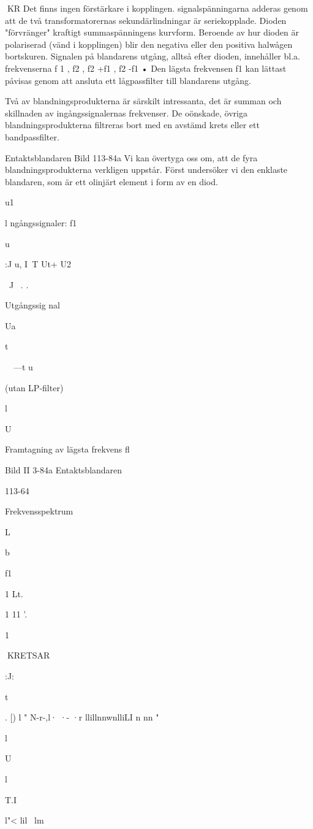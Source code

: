 \documentclass[a4paper,twoside,twocolumn,openright]{book}
\begin{document}
{{{{{{{KR
Det finns ingen förstärkare i kopplingen.
signalspänningarna adderas genom att de
två transformatorernas sekundärlindningar
är seriekopplade. Dioden "förvränger" kraftigt summaspänningens kurvform. Beroende
av hur dioden är polariserad (vänd i kopplingen) blir den negativa eller den positiva
halwågen bortskuren.
Signalen på blandarens utgång, alltså
efter dioden, innehåller bl.a. frekvenserna f 1 ,
f2 , f2 +f1 , f2 -f1 • Den lägsta frekvensen f1 kan
lättast påvisas genom att ansluta ett lågpassfilter till blandarens utgång.

Två av blandningsprodukterna är särskilt
intressanta, det är summan och skillnaden
av ingångssignalernas frekvenser. De oönskade, övriga blandningsprodukterna filtreras bort med en avstämd krets eller ett
bandpassfilter.

Entaktsblandaren
Bild 113-84a
Vi kan övertyga oss om, att de fyra blandningsprodukterna verkligen uppstår. Först
undersöker vi den enklaste blandaren, som
är ett olinjärt element i form av en diod.

u1

l ngångssignaler:
f1

u

:J u, I~T
Ut+ U2

~J~ . .

Utgångssig nal

Ua

t

~~---t
u

(utan LP-filter)

l

U

Framtagning av lägsta frekvens fl

Bild II 3-84a Entaktsblandaren

113-64

Frekvensspektrum

L

b

f1

1 Lt.~

1 11
'.


1

KRETSAR

:J:

t

.
[) l "
N-r-,l· ·- ·r llillnnwnlliLI
n nn "

l

U

l

T.I} l"< lil~
lm~

}}}}}}
\end{document}

